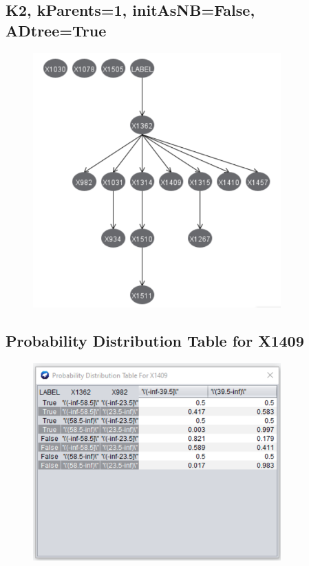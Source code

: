 \documentclass[11pt]{article}
\begin{document}
\begin{appendices}
\subsection{K2, kParents=1, initAsNB=False, ADtree=True}\label{image711} 
\begin{figure}[h!]
  \centering
  \includegraphics[width=0.85\textwidth]{images/7_1(1).png}
\end{figure}

\newpage
\subsection{Probability Distribution Table for X1409}\label{image7s4} 
\begin{figure}[h!]
  \centering
  \includegraphics[width=0.85\textwidth]{images/7_4.png}
\end{figure}

\end{appendices}
\end{document}
